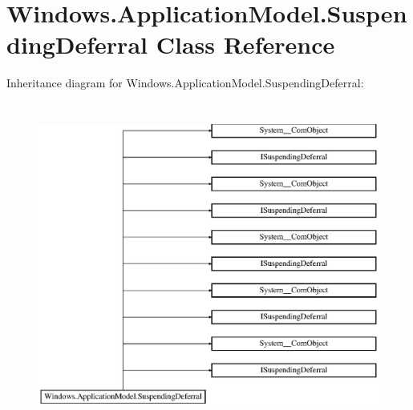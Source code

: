 \hypertarget{class_windows_1_1_application_model_1_1_suspending_deferral}{}\section{Windows.\+Application\+Model.\+Suspending\+Deferral Class Reference}
\label{class_windows_1_1_application_model_1_1_suspending_deferral}
Inheritance diagram for Windows.\+Application\+Model.\+Suspending\+Deferral\+:\begin{figure}[H]
\begin{center}
\leavevmode
\includegraphics[height=10.657439cm]{class_windows_1_1_application_model_1_1_suspending_deferral}
\end{center}
\end{figure}
